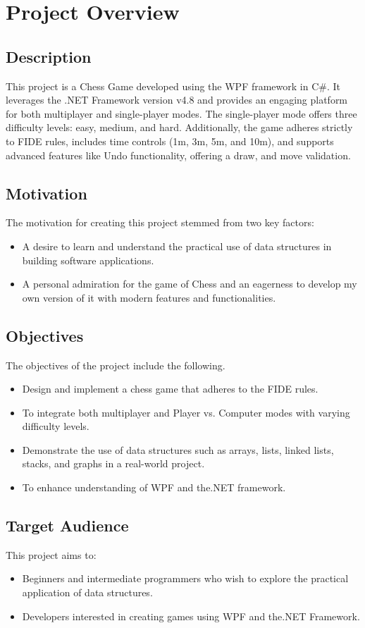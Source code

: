 \documentclass[a4paper,12pt]{article}
\begin{document}
\section{Project Overview}

\subsection{Description}
This project is a Chess Game developed using the WPF framework in C\#. It leverages the .NET Framework version v4.8 and provides an engaging platform for both multiplayer and single-player modes. The single-player mode offers three difficulty levels: easy, medium, and hard. Additionally, the game adheres strictly to FIDE rules, includes time controls (1m, 3m, 5m, and 10m), and supports advanced features like Undo functionality, offering a draw, and move validation. 

\subsection{Motivation}
The motivation for creating this project stemmed from two key factors:
\begin{itemize}
    \item A desire to learn and understand the practical use of data structures in building software applications.
    \item A personal admiration for the game of Chess and an eagerness to develop my own version of it with modern features and functionalities.
\end{itemize}

\subsection{Objectives}
The objectives of the project include the following.
\begin{itemize}
    \item Design and implement a chess game that adheres to the FIDE rules.
    \item To integrate both multiplayer and Player vs. Computer modes with varying difficulty levels.
    \item Demonstrate the use of data structures such as arrays, lists, linked lists, stacks, and graphs in a real-world project.
    \item To enhance understanding of WPF and the.NET framework.
\end{itemize}

\subsection{Target Audience}
This project aims to:
\begin{itemize}
    \item Beginners and intermediate programmers who wish to explore the practical application of data structures.
    \item Developers interested in creating games using WPF and the.NET Framework.
\end{itemize}
\end{document}
